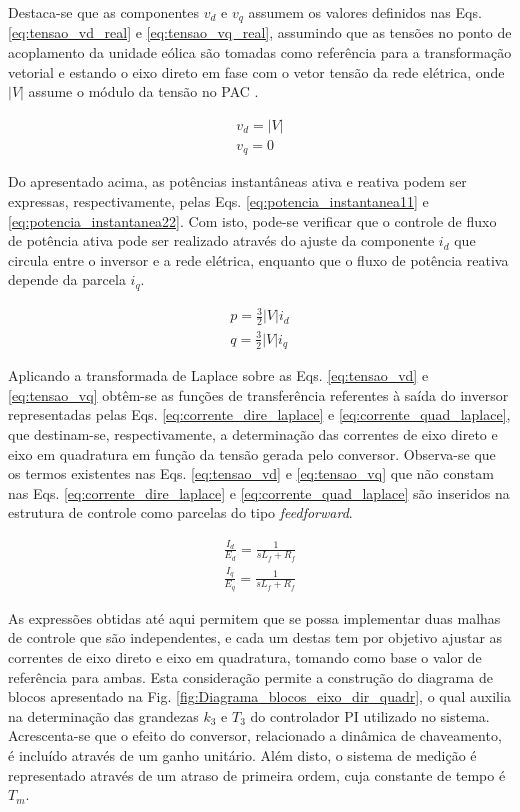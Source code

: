 Destaca-se que as componentes $v_d$ e $v_q$ assumem os valores definidos nas Eqs. \ref{eq:tensao_vd_real} e \ref{eq:tensao_vq_real}, assumindo que as tensões no ponto de acoplamento da unidade eólica são tomadas como referência para a transformação vetorial e estando o eixo direto em fase com o vetor tensão da rede elétrica, onde $|V|$ assume o módulo da tensão no PAC \cite{TeseProfAlex}. 

\begin{align}
	v_d = |V|\label{eq:tensao_vd_real}\\
	v_q = 0\label{eq:tensao_vq_real}
\end{align}

Do apresentado acima, as potências instantâneas ativa e reativa podem ser expressas, respectivamente, pelas Eqs. \ref{eq:potencia_instantanea11} e \ref{eq:potencia_instantanea22}. Com isto, pode-se verificar que o controle de fluxo de potência ativa pode ser realizado através do ajuste da componente $i_d$ que circula entre o inversor e a rede elétrica, enquanto que o fluxo de potência reativa depende da parcela $i_q$.

\begin{align}
	p = \frac{3}{2}|V|i_d\label{eq:potencia_instantanea11}\\
	q = \frac{3}{2}|V|i_q\label{eq:potencia_instantanea22}
\end{align}

Aplicando a transformada de Laplace sobre as Eqs. \ref{eq:tensao_vd} e \ref{eq:tensao_vq} obtêm-se as funções de transferência referentes à saída do inversor representadas pelas Eqs. \ref{eq:corrente_dire_laplace} e \ref{eq:corrente_quad_laplace}, que destinam-se, respectivamente, a determinação das correntes de eixo direto e eixo em quadratura em função da tensão gerada pelo conversor. Observa-se que os termos existentes nas Eqs. \ref{eq:tensao_vd} e \ref{eq:tensao_vq} que não constam nas Eqs. \ref{eq:corrente_dire_laplace} e \ref{eq:corrente_quad_laplace} são inseridos na estrutura de controle como parcelas do tipo \textit{feedforward}.

\begin{align}
	\frac{I_d}{E_d} = \frac{1}{sL_f + R_f}\label{eq:corrente_dire_laplace}\\
	\frac{I_q}{E_q} = \frac{1}{sL_f + R_f}\label{eq:corrente_quad_laplace}
\end{align}

As expressões obtidas até aqui permitem que se possa implementar duas malhas de controle que são independentes, e cada um destas tem por objetivo ajustar as correntes de eixo direto e eixo em quadratura, tomando como base o valor de referência para ambas. Esta consideração permite a construção do diagrama de blocos apresentado na Fig. \ref{fig:Diagrama_blocos_eixo_dir_quadr}, o qual auxilia na determinação das grandezas $k_3$ e $T_3$ do controlador PI utilizado no sistema. Acrescenta-se que o efeito do conversor, relacionado a dinâmica de chaveamento, é incluído através de um ganho unitário. Além disto, o sistema de medição é representado através de um atraso de primeira ordem, cuja constante de tempo é $T_m$.

